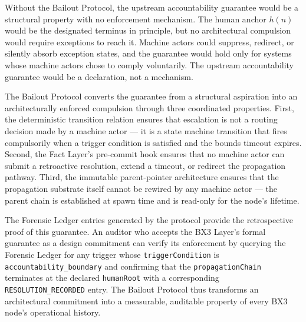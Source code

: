 Without the Bailout Protocol, the upstream accountability guarantee would be a structural property with no enforcement mechanism. The human anchor $h(n)$ would be the designated terminus in principle, but no architectural compulsion would require exceptions to reach it. Machine actors could suppress, redirect, or silently absorb exception states, and the guarantee would hold only for systems whose machine actors chose to comply voluntarily. The upstream accountability guarantee would be a declaration, not a mechanism.

The Bailout Protocol converts the guarantee from a structural aspiration into an architecturally enforced compulsion through three coordinated properties. First, the deterministic transition relation ensures that escalation is not a routing decision made by a machine actor — it is a state machine transition that fires compulsorily when a trigger condition is satisfied and the bounds timeout expires. Second, the Fact Layer's pre-commit hook ensures that no machine actor can submit a retroactive resolution, extend a timeout, or redirect the propagation pathway. Third, the immutable parent-pointer architecture ensures that the propagation substrate itself cannot be rewired by any machine actor — the parent chain is established at spawn time and is read-only for the node's lifetime.

The Forensic Ledger entries generated by the protocol provide the retrospective proof of this guarantee. An auditor who accepts the BX3 \purpose{} Layer's formal guarantee as a design commitment can verify its enforcement by querying the Forensic Ledger for any trigger whose \texttt{triggerCondition} is \texttt{accountability\_boundary} and confirming that the \texttt{propagationChain} terminates at the declared \texttt{humanRoot} with a corresponding \texttt{RESOLUTION\_RECORDED} entry. The Bailout Protocol thus transforms an architectural commitment into a measurable, auditable property of every BX3 node's operational history.